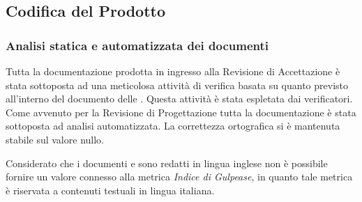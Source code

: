 \newpage
\subsection{Codifica del Prodotto} 

\subsubsection{Analisi statica e automatizzata dei documenti}\label{resocontoProgettazioneArchitetturale}
Tutta la documentazione prodotta in ingresso alla Revisione di Accettazione è stata sottoposta ad una meticolosa attività di verifica
basata su quanto previsto all'interno del documento delle .
Questa attività è stata espletata dai verificatori.
Come avvenuto per la Revisione di Progettazione tutta la documentazione è stata sottoposta ad analisi automatizzata.
La correttezza ortografica si è mantenuta stabile sul valore nullo.

Considerato che i documenti  e   sono redatti in lingua inglese
non è possibile fornire un valore connesso alla metrica \textit{Indice di Gulpease}, in quanto tale metrica è riservata a contenuti 
testuali in lingua italiana.



